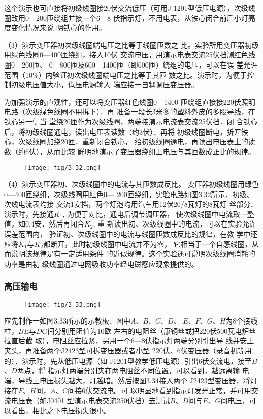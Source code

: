 这个演示也可直接将初级线圈接20伏交流低压（可用J
1201型低压电源），次级线圈改用0—200匝绕组并接一个6—8
伏指示灯，不用电表，从铁心闭合前后小灯亮度变化情况来说
明铁心的作用。

（3）演示变压器初次级线圈端电压之比等于线圈匝数之
比。实验所用变压器初级用绿色线圈0—400匝绕组，接入10伏
交流电压，用演示电表交流25伏挡测红色线圈0—200匝、
0—800匝及600—1400匝（即600匝）绕组的电压，可以在误
差允许范围（10\%）内验证初次级线圈端电压之比等于其匝
数之比。演示时，为便于控制初级电压值大小，低压电源输入
端应接一自耦调压变压器。

为加强演示的直观性，还可以将变压器红色线圈0—1400
匝绕组直接接220伏照明电路（次级绿色线圈不用拆下）．再
准备一段长3米多的塑料外皮的多股导线，在铁心另一侧当
堂绕20匝作为次级线圈，两端接演示电流表交流25伏挡．闭
合铁心后，将初级线圈通电，读出电压表读数（约3伏）．再将
初级线圈断电，拆开铁心，次级线圈加绕20匝．重新闭合铁心，
给初级线圈通电，再读出电压表上的读数（约6伏），从而比较
鲜明地演示了变压器绕组上电压与其匝数成正比的规律。

\begin{figure}[htp]
    \centering
\texttt{[image: fig/3-32.png]}
    \caption{}
\end{figure}

（4）演示变压器初、次级线圈中的电流与其匝数成反比。
变压器初级线圈用绿色0—400匝绕组，次级线圈用红色0—
200匝绕组，实验电路如图3.32所示．初级、次线电流表均接
交流1安挡，两个灯泡均用汽车用12伏20/8瓦灯的8瓦灯
丝部分．演示时，先接通$K_1$, 为便于对比，通电后调节调压器，
使次级线圈中电流取一整值，如0.4安．然后再闭合$K_2$, 重
新读出初、次级线圈中的电流，可以在实验允许误差范围内，
验证初、次级线圈中的电流与线圈匝数成反比的规律，在教
学中还应将$K_1$与$K_2$都断开，此时初级线圈中电流并不为零，
它相当于一个自感线圈，从而说明该规律是有一定适用条件
的近似规律。这个实验还可说明次级线圈消耗的功率是由初
级线圈通过电网吸收功率经电磁感应现象提供的。

\subsubsection{高压输电}

\begin{figure}[htp]
    \centering
\texttt{[image: fig/3-33.png]}
    \caption{}
\end{figure}

应先制作一如图3.33所示的示教板．图中$A$、$B$、$C$、$D$、
$E$、$F$、$G$、$H$为8个接线柱，$BE$与$DG$间分别用阻值为10欧
左右的电阻丝（康铜丝或把220伏500瓦电炉丝拉直后截
取），电阻丝应拉紧，另用一个6—8伏指示灯两端分别引出导
线并安上夹头，再准备两个J2423型可拆变压器或者小型
220伏、6伏变压器（录音机等用的）．演示时，先从低压电源（如
J1201型教学低压电源）引出6伏交流电，接至$B$、$D$两点，将
指示灯两端分别夹在两电阻丝不同位置，可以看到，越远离输
电端，导线上电压损失越大，灯越暗。然后按图3.34接入两个
J2423型变压器，将灯接在$F$、$H$间，$A$、$C$间接6伏交流电。可
以明显地看到指示灯发光正常，并可用交流电压表（如J0401
型演示电表交流250伏挡）去测试$B$、$D$间与$E$、$G$间电压，可
以看出，相比之下电压损失很小。

